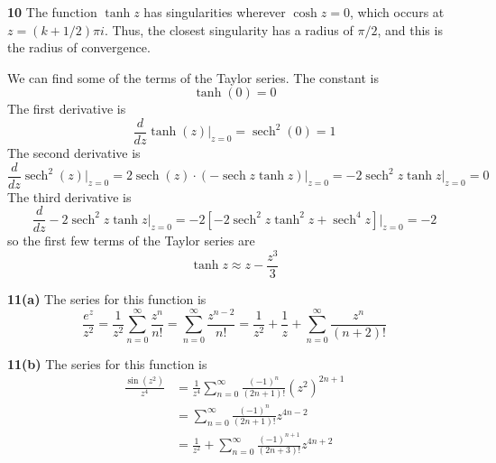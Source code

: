 \documentclass{article}
\DeclareMathOperator{\sech}{sech}
\begin{document}
\textbf{10}
The function $\tanh z$ has singularities wherever $\cosh z = 0$, which occurs at $z = (k + 1/2) \pi i$. Thus, the closest singularity has a radius of $\pi/2$, and this is the radius of convergence.

We can find some of the terms of the Taylor series. The constant is
\[
	\tanh(0) = 0
\]
The first derivative is
\[
	\frac{d}{dz} \tanh(z) \Big|_{z=0}
	= \sech^2(0)
	= 1
\]
The second derivative is
\[
	\frac{d}{dz} \sech^2(z) \Big|_{z=0}
	= 2\sech(z) \cdot (-\sech z \tanh z) \Big|_{z=0}
	= -2\sech^2 z \tanh z \Big|_{z=0}
	= 0
\]
The third derivative is
\[
	\frac{d}{dz} -2\sech^2 z \tanh z \Big|_{z=0}
	= -2 \left[ -2\sech^2 z \tanh^2 z + \sech^4 z \right] \Big|_{z=0}
	= -2
\]
so the first few terms of the Taylor series are
\[
	\tanh z \approx z - \frac{z^3}{3}
\]

\textbf{11(a)}
The series for this function is
\[
	\frac{e^z}{z^2}
	= \frac{1}{z^2} \sum_{n=0}^\infty \frac{z^n}{n!}
	= \sum_{n=0}^\infty \frac{z^{n-2}}{n!}
	= \frac{1}{z^2} + \frac{1}{z} + \sum_{n=0}^\infty \frac{z^n}{(n+2)!}
\]

\textbf{11(b)}
The series for this function is
\begin{align*}
	\frac{\sin(z^2)}{z^4}
	&= \frac{1}{z^4} \sum_{n=0}^\infty \frac{(-1)^n}{(2n+1)!} (z^2)^{2n+1} \\
	&= \sum_{n=0}^\infty \frac{(-1)^n}{(2n+1)!} z^{4n - 2} \\
	&= \frac{1}{z^2} + \sum_{n=0}^\infty \frac{(-1)^{n+1}}{(2n+3)!} z^{4n+2}
\end{align*}
\end{document}
